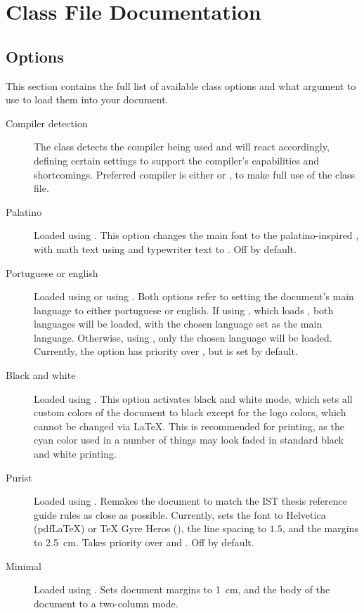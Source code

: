 \documentclass[palatino,english]{ist-report}
\begin{document}
\section{Class File Documentation}

\subsection{Options}\label{sec:options}

This section contains the full list of available class options and what argument to use to load them into your document.
\begin{description}
	\item [Compiler detection] The class detects the compiler being used and will react accordingly, defining certain settings to support the compiler's capabilities and shortcomings. Preferred compiler is either \XeLaTeX{} or \LuaLaTeX{}, to make full use of the class file\footnotemark{}. 
	\item [Palatino] Loaded using . This option changes the main font to the palatino-inspired , with math text using  and typewriter text to . Off by default.
	\item [Portuguese or english] Loaded using  or using . Both options refer to setting the document's main language to either portuguese or english. If using \XeLaTeX{}, which loads , both languages will be loaded, with the chosen language set as the main language. Otherwise, using , only the chosen language will be loaded. Currently, the  option has priority over , but  is set by default.
	\item [Black and white] Loaded using . This option activates black and white mode, which sets all custom colors of the document to black except for the logo colors, which cannot be changed via \LaTeX{}. This is recommended for printing, as the cyan color used in a number of things may look faded in standard black and white printing.
	\item [Purist] Loaded using . Remakes the document to match the IST thesis reference guide rules as close as possible. Currently, sets the font to Helvetica (pdf\LaTeX{}) or \TeX{} Gyre Heros (\XeLaTeX{}), the line spacing to $1.5$, and the margins to \SI{2.5}{\centi\meter}. Takes priority over  and . Off by default.
	\item [Minimal] Loaded using . Sets document margins to \SI{1}{\centi\meter}, and the body of the document to a two-column mode.
\end{description}
\end{document}

